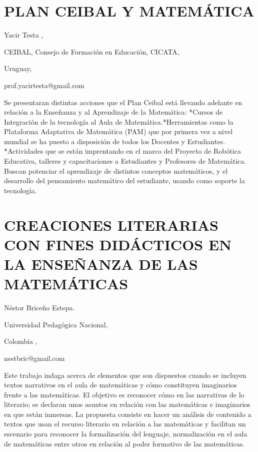 \section{PLAN CEIBAL Y MATEMÁTICA }

\begin{datos}

Yacir Testa ,

CEIBAL, Consejo de Formación en Educación, CICATA, 

Uruguay,

prof.yacirtesta@gmail.com 

\end{datos}

Se presentaran distintas acciones que el Plan Ceibal está llevando
adelante en relación a la Enseñanza y al Aprendizaje de la Matemática:
{*}Cursos de Integración de la tecnología al Aula de Matemática.{*}Herramientas
como la Plataforma Adaptativa de Matemática (PAM) que por primera
vez a nivel mundial se ha puesto a disposición de todos los Docentes
y Estudiantes. {*}Actividades que se están imprentando en el marco
del Proyecto de Robótica Educativa, talleres y capacitaciones a Estudiantes
y Profesores de Matemática. Buscan potenciar el aprendizaje de distintos
conceptos matemáticos, y el desarrollo del pensamiento matemático
del estudiante, usando como soporte la tecnología. 


\section{CREACIONES LITERARIAS CON FINES DIDÁCTICOS EN LA ENSEÑANZA DE LAS
MATEMÁTICAS}

\begin{datos}

Néstor Briceño Estepa.

Universidad Pedagógica Nacional,

Colombia ,

nestbric@gmail.com

\end{datos}

Este trabajo indaga acerca de elementos que son dispuestos cuando
se incluyen textos narrativos en el aula de matemáticas y cómo constituyen
imaginarios frente a las matemáticas. El objetivo es reconocer cómo
en las narrativas de lo literario; se declaran unos asuntos en relación
con las matemáticas e imaginarios en que están inmersas. La propuesta
consiste en hacer un análisis de contenido a textos que usan el recurso
literario en relación a las matemáticas y facilitan un escenario para
reconocer la formalización del lenguaje, normalización en el aula
de matemáticas entre otros en relación al poder formativo de las matemáticas.


